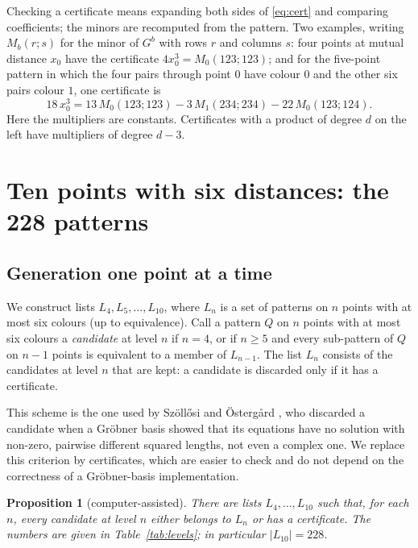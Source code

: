 \documentclass[11pt]{amsart}
\newtheorem{proposition}[theorem]{Proposition}
\theoremstyle{definition}
\theoremstyle{remark}
\begin{document}
Checking a certificate means expanding both sides of \eqref{eq:cert} and comparing coefficients; the
minors are recomputed from the pattern. Two examples, writing $M_b(r;s)$ for the minor of $G^b$ with rows
$r$ and columns $s$: four points at mutual distance $x_0$ have the certificate $4x_0^3=M_0(123;123)$; and
for the five-point pattern in which the four pairs through point $0$ have colour $0$ and the other six
pairs colour $1$, one certificate is
\[
  18\,x_0^3 = 13\,M_0(123;123)-3\,M_1(234;234)-22\,M_0(123;124).
\]
Here the multipliers are constants. Certificates with a product of degree $d$ on the left have multipliers
of degree $d-3$.

\section{Ten points with six distances: the 228 patterns}\label{sec:patterns}

\subsection{Generation one point at a time}
We construct lists $L_4,L_5,\dots,L_{10}$, where $L_n$ is a set of patterns on $n$ points with at most six
colours (up to equivalence). Call a pattern $Q$ on $n$ points with at most six colours a
\emph{candidate} at level $n$ if $n=4$, or if $n\ge5$ and every sub-pattern of $Q$ on $n-1$ points is
equivalent to a member of $L_{n-1}$. The list $L_n$ consists of the candidates at level $n$ that are kept:
a candidate is discarded only if it has a certificate.

This scheme is the one used by Szöllősi and Östergård \cite{SO}, who discarded a candidate when a Gröbner
basis showed that its equations have no solution with non-zero, pairwise different squared lengths, not
even a complex one. We replace this criterion by certificates, which are easier to check and do not
depend on the correctness of a Gröbner-basis implementation.

\begin{proposition}[computer-assisted]\label{prop:lists}
There are lists $L_4,\dots,L_{10}$ such that, for each $n$, every candidate at level $n$ either belongs to
$L_n$ or has a certificate. The numbers are given in Table~\ref{tab:levels}; in particular $|L_{10}|=228$.
\end{proposition}
\end{document}
